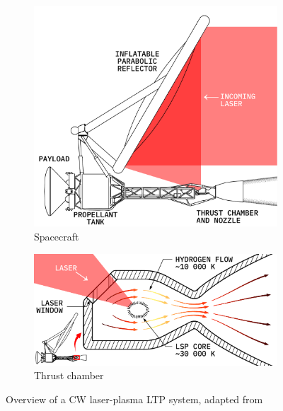         \begin{figure}[t]
            \centering
            \begin{subfigure}[t]{0.64\textwidth}
                \centering
                \includegraphics[width=\textwidth]{assets/2 background/overview_ltp}
                \caption{Spacecraft}
                \label{fig:overview_spacecraft}
            \end{subfigure}
            \begin{subfigure}[t]{0.64\textwidth}
                \centering
                \includegraphics[width=\textwidth]{assets/2 background/chamber}
                \caption{Thrust chamber}
                \label{fig:overview_chamber}
            \end{subfigure}
            \caption[Overview of a CW laser-plasma LTP system]{Overview of a CW laser-plasma LTP system, adapted from \textcite{duplayDesignRapidTransit2022}}
            \label{fig:overview}
        \end{figure}

